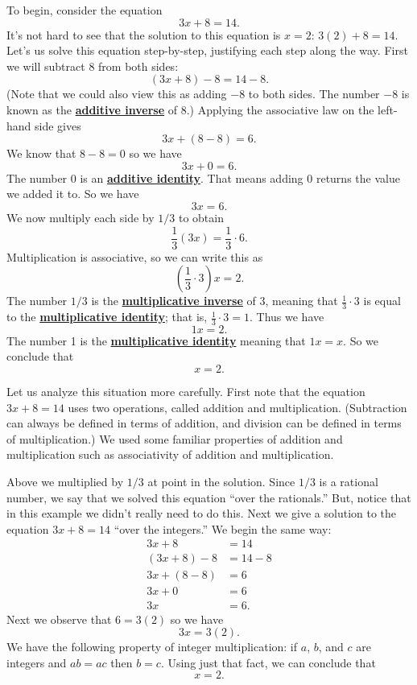 \documentclass[11pt]{article}
\renewcommand\emph[1]{\underline{\bf{#1}}} %
\theoremstyle{definition}
\begin{document}
To begin, consider the equation
      \[ 3x + 8 = 14. \]
It's not hard to see that the solution to this equation is $x=2$: $3(2)+8 = 14$. Let's us solve this equation step-by-step, justifying each step along the 
way. First we will subtract $8$ from both sides:
\[ (3x+8)-8 = 14 -8.\]
(Note that we could also view this as adding $-8$ to both sides. The number $-8$ is known as the \emph{additive inverse} of $8$.) Applying the associative 
law on the left-hand side gives
\[ 3x + (8-8) = 6.\]
We know that $8-8=0$ so we have
\[ 3x + 0 = 6.\]
The number 0 is an \emph{additive identity}. That means adding 0 returns the value we added it to. So we have
\[ 3x = 6.\]
We now multiply each side by $1/3$ to obtain
\[ \frac{1}{3}(3x) = \frac{1}{3}\cdot 6. \]
Multiplication is associative, so we can write this as
\[ \left( \frac{1}{3}\cdot 3 \right)x = 2. \]
The number $1/3$ is the \emph{multiplicative inverse} of $3$, meaning that $\frac{1}{3}\cdot 3$ is equal to the \emph{multiplicative identity}; that is, $\frac{1}{3}\cdot 3 = 1$. Thus we have
\[ 1x = 2.\]
The number 1 is the \emph{multiplicative identity} meaning that $1x = x$. So we conclude that
\[ x = 2.\]

Let us analyze this situation more carefully. First note that the equation $3x+8 = 14$ uses two operations, called addition and multiplication. 
(Subtraction can always be defined in terms of addition, and division can be defined in terms of multiplication.)
We used some familiar properties of addition and multiplication such as associativity of addition and multiplication.

Above we multiplied by $1/3$ at point in the solution. Since $1/3$ is a rational number, we say that we solved this equation ``over the
rationals.'' But, notice that in this example we didn't really need to do this. Next we give a solution to the equation $3x+8=14$ ``over the
integers.'' We begin the same way:
\begin{align*}
  3x + 8 &= 14\\
 (3x+8)-8 &= 14 -8\\
 3x + (8-8) &= 6\\
 3x + 0 &= 6\\
 3x &= 6.
\end{align*}
Next we observe that $6 = 3(2)$ so we have
\[ 3x = 3(2).\]
We have the following property of integer multiplication: if $a$, $b$, and $c$ are integers and $ab=ac$ then $b=c$. Using just that fact, we can conclude that
\[ x = 2.\]
\end{document}
